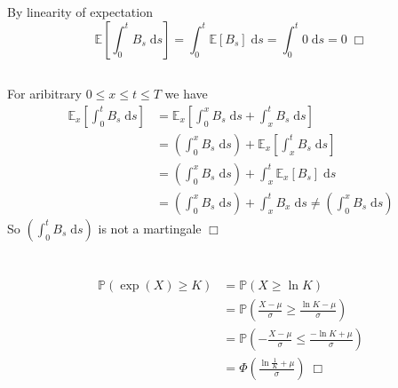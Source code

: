 \documentclass{article}
\begin{document}
\section{}
\subsection{}
By linearity of expectation
$$\mathbb{E}\left[\int_0^t B_s \;\mathrm{d}s \right] = \int_0^t \mathbb{E}[B_s] \;\mathrm{d}s = \int_0^t 0 \;\mathrm{d}s = 0 \; \Box$$

\subsection{}
For aribitrary $0 \leq x \leq t \leq T$ we have
\begin{equation*}
\begin{split}
\mathbb{E}_x \left[ \int_0^t B_s \;\mathrm{d}s \right] &= \mathbb{E}_x \left[ \int_0^x B_s \;\mathrm{d}s + \int_x^t B_s \;\mathrm{d}s \right]\\
&= \left( \int_0^x B_s \;\mathrm{d}s \right)+ \mathbb{E}_x \left[ \int_x^t B_s \;\mathrm{d}s \right]\\
&= \left( \int_0^x B_s \;\mathrm{d}s \right) + \int_x^t \mathbb{E}_x[B_s] \;\mathrm{d}s\\
&= \left( \int_0^x B_s \;\mathrm{d}s \right) + \int_x^t B_x \;\mathrm{d}s \neq \left( \int_0^x B_s \;\mathrm{d}s \right)
\end{split}
\end{equation*}
So $\left( \int_0^t B_s \;\mathrm{d}s \right)$ is not a martingale $\Box$

\section{}
\begin{equation*}
\begin{split}
\mathbb{P}(\exp (X) \geq K) &= \mathbb{P}(X \geq \ln K)\\
&= \mathbb{P}(\frac{X - \mu}{\sigma} \geq \frac{\ln K - \mu}{\sigma})\\
&= \mathbb{P}(- \frac{X- \mu}{\sigma} \leq \frac{-\ln K + \mu}{\sigma})\\
&= \Phi\left(\frac{\ln \frac{1}{K} + \mu}{\sigma}\right) \; \Box
\end{split}
\end{equation*}

\section{}
\end{document}
